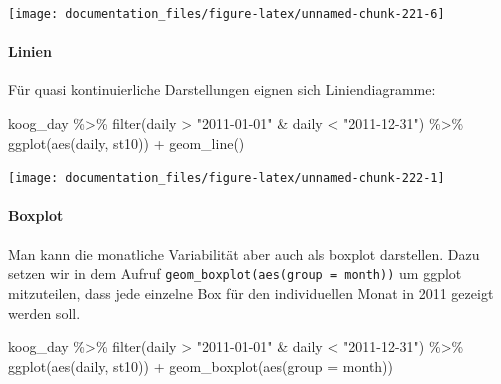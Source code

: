 \documentclass[
]{article}
\newenvironment{Shaded}{\begin{snugshade}}{\end{snugshade}}
\newcommand{\AttributeTok}[1]{\textcolor[rgb]{0.77,0.63,0.00}{#1}}
\newcommand{\FunctionTok}[1]{\textcolor[rgb]{0.00,0.00,0.00}{#1}}
\newcommand{\NormalTok}[1]{#1}
\newcommand{\SpecialCharTok}[1]{\textcolor[rgb]{0.00,0.00,0.00}{#1}}
\newcommand{\StringTok}[1]{\textcolor[rgb]{0.31,0.60,0.02}{#1}}
\begin{document}
\begin{center}\texttt{[image: documentation\_files/figure-latex/unnamed-chunk-221-6]} \end{center}

\hypertarget{linien}{%
\paragraph{Linien}\label{linien}}

Für quasi kontinuierliche Darstellungen eignen sich Liniendiagramme:

\begin{Shaded}
\begin{Highlighting}[]
\NormalTok{koog\_day }\SpecialCharTok{\%\textgreater{}\%}
  \FunctionTok{filter}\NormalTok{(daily }\SpecialCharTok{\textgreater{}} \StringTok{"2011{-}01{-}01"} \SpecialCharTok{\&}\NormalTok{ daily }\SpecialCharTok{\textless{}} \StringTok{"2011{-}12{-}31"}\NormalTok{) }\SpecialCharTok{\%\textgreater{}\%}
  \FunctionTok{ggplot}\NormalTok{(}\FunctionTok{aes}\NormalTok{(daily, st10)) }\SpecialCharTok{+}
  \FunctionTok{geom\_line}\NormalTok{()}
\end{Highlighting}
\end{Shaded}

\begin{center}\texttt{[image: documentation\_files/figure-latex/unnamed-chunk-222-1]} \end{center}

\hypertarget{boxplot}{%
\paragraph{Boxplot}\label{boxplot}}

Man kann die monatliche Variabilität aber auch als boxplot darstellen. Dazu setzen wir in dem Aufruf \texttt{geom\_boxplot(aes(group\ =\ month))} um ggplot mitzuteilen, dass jede einzelne Box für den individuellen Monat in 2011 gezeigt werden soll.

\begin{Shaded}
\begin{Highlighting}[]
\NormalTok{koog\_day }\SpecialCharTok{\%\textgreater{}\%}
  \FunctionTok{filter}\NormalTok{(daily }\SpecialCharTok{\textgreater{}} \StringTok{"2011{-}01{-}01"} \SpecialCharTok{\&}\NormalTok{ daily }\SpecialCharTok{\textless{}} \StringTok{"2011{-}12{-}31"}\NormalTok{) }\SpecialCharTok{\%\textgreater{}\%}
  \FunctionTok{ggplot}\NormalTok{(}\FunctionTok{aes}\NormalTok{(daily, st10)) }\SpecialCharTok{+}
  \FunctionTok{geom\_boxplot}\NormalTok{(}\FunctionTok{aes}\NormalTok{(}\AttributeTok{group =}\NormalTok{ month))}
\end{Highlighting}
\end{Shaded}
\end{document}
